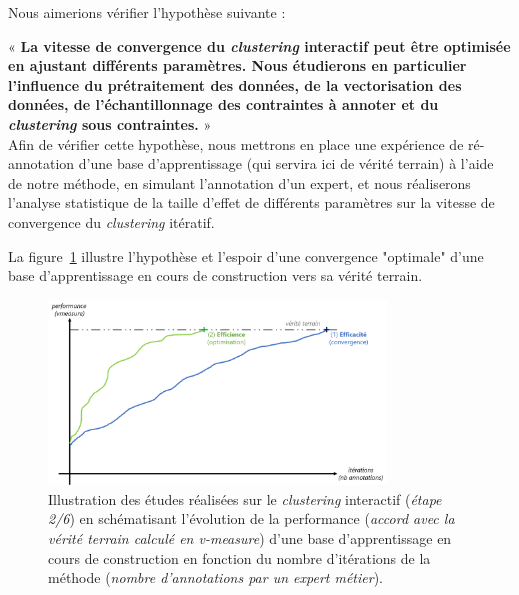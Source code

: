 		Nous aimerions vérifier l'hypothèse suivante :

		\begin{tcolorbox}[
			title=\textbf{Hypothèse d'efficience},
			colback=gray!20,
			colframe=gray!50!black!75,
			width=\linewidth
		]

			« \textbf{
				La vitesse de convergence du \textit{clustering} interactif peut être optimisée en ajustant différents paramètres. Nous étudierons en particulier l'influence du prétraitement des données, de la vectorisation des données, de l'échantillonnage des contraintes à annoter et du \textit{clustering} sous contraintes.
			} » \\
			
			Afin de vérifier cette hypothèse, nous mettrons en place une expérience de ré-annotation d'une base d'apprentissage (qui servira ici de vérité terrain) à l'aide de notre méthode, en simulant l'annotation d'un expert, et nous réaliserons l'analyse statistique de la taille d'effet de différents paramètres sur la vitesse de convergence du \textit{clustering} itératif.
			
			La figure~\ref{figure:4.2-HYPOTHESE-EFFICIENCE} illustre l'hypothèse et l'espoir d'une convergence "optimale" d'une base d'apprentissage en cours de construction vers sa vérité terrain.
			
			\begin{figure}[H]
				\centering
				\includegraphics[width=0.8\textwidth]{figures/hypotheses-02-efficience}
				\caption{Illustration des études réalisées sur le \textit{clustering} interactif (\textit{étape 2/6}) en schématisant l'évolution de la performance (\textit{accord avec la vérité terrain calculé en v-measure}) d'une base d'apprentissage en cours de construction en fonction du nombre d'itérations de la méthode (\textit{nombre d'annotations par un expert métier}).}
				\label{figure:4.2-HYPOTHESE-EFFICIENCE}
			\end{figure}

		\end{tcolorbox}
		
